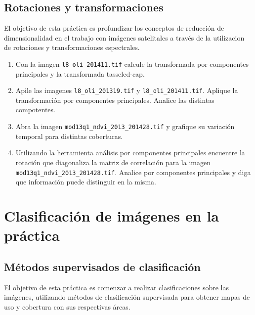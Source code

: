 \documentclass[hidelinks,12pt]{article}
\begin{document}
\subsection{Rotaciones y transformaciones \label{rot:pra}}
El objetivo de esta práctica es  profundizar los conceptos de reducción
de dimensionalidad en el trabajo con imágenes satelitales a través de la
utilizacion de rotaciones y transformaciones espectrales.

\begin{enumerate}
    \item Con la imagen \texttt{l8\_oli\_2014\-11.tif} calcule la
        transformada por componentes principales y la transformada tasseled-cap.
    \item \label{pca} Apile las imagenes
        \texttt{l8\_oli\_2013\-19.tif}
        y \texttt{l8\_oli\_2014\-11.tif}.
        Aplique la transformaci\'on por componentes principales.
        Analice las distintas compotentes.
    \item Abra la imagen \texttt{mod13q1\_ndvi\_2013\_2014\-28.tif}
        y grafique su variación temporal para distintas coberturas.
    \item Utilizando la herramienta análisis por componentes principales
        encuentre la rotación que diagonaliza la matriz de correlación para la
        imagen \texttt{mod13q1\_ndvi\_2013\_2014\-28.tif}. Analice
        por componentes principales y diga que información puede distinguir en
        la misma.
\end{enumerate}
\newpage
\section{Clasificación de imágenes en la práctica}
\subsection{Métodos supervisados de clasificación}
El objetivo de esta práctica es comenzar a realizar clasificaciones sobre las imágenes, utilizando métodos de clasificación supervisada para obtener
mapas de uso y cobertura con sus respectivas áreas.
\end{document}
